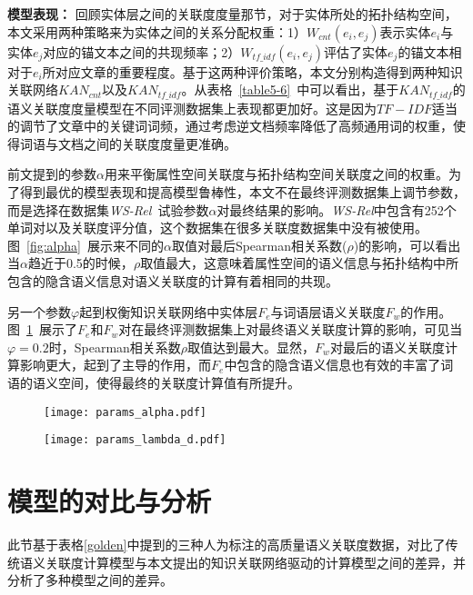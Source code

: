 \textbf{模型表现：}
回顾实体层之间的关联度度量那节，对于实体所处的拓扑结构空间，本文采用两种策略来为实体之间的关系分配权重：1）$W_{cnt}(e_i,e_j)$表示实体$e_i$与实体$e_j$对应的锚文本之间的共现频率；2）$W_{tf\_idf}(e_i,e_j)$评估了实体$e_j$的锚文本相对于$e_i$所对应文章的重要程度。基于这两种评价策略，本文分别构造得到两种知识关联网络$KAN_{cnt}$以及$KAN_{tf\_idf}$。从表格~\ref{table5-6}~中可以看出，基于$KAN_{tf\_idf}$的语义关联度度量模型在不同评测数据集上表现都更加好。这是因为$TF-IDF$适当的调节了文章中的关键词词频，通过考虑逆文档频率降低了高频通用词的权重，使得词语与文档之间的关联度度量更准确。

前文提到的参数$\alpha$用来平衡属性空间关联度与拓扑结构空间关联度之间的权重。为了得到最优的模型表现和提高模型鲁棒性，本文不在最终评测数据集上调节参数，而是选择在数据集\emph{WS-Rel}~\cite{ws/AgirreAHKPS09}试验参数$\alpha$对最终结果的影响。\emph{WS-Rel}中包含有252个单词对以及关联度评分值，这个数据集在很多关联度数据集中没有被使用。图~\ref{fig:alpha}~展示来不同的$\alpha$取值对最后Spearman相关系数($\rho$)的影响，可以看出当$\alpha$趋近于0.5的时候，$\rho$取值最大，这意味着属性空间的语义信息与拓扑结构中所包含的隐含语义信息对语义关联度的计算有着相同的共现。

另一个参数$\varphi$起到权衡知识关联网络中实体层$F_e$与词语层语义关联度$F_w$的作用。图~\ref{fig:lambda}~展示了$F_e$和$F_w$对在最终评测数据集上对最终语义关联度计算的影响，可见当$\varphi=0.2$时，Spearman相关系数$\rho$取值达到最大。显然，$F_w$对最后的语义关联度计算影响更大，起到了主导的作用，而$F_e$中包含的隐含语义信息也有效的丰富了词语的语义空间，使得最终的关联度计算值有所提升。

\begin{figure}[htbp]
    \begin{minipage}{0.48\textwidth}
      \centering
      \texttt{[image: params\_alpha.pdf]}
      \label{fig:alpha}
    \end{minipage}\hfill
    \begin{minipage}{0.48\textwidth}
      \centering
      \texttt{[image: params\_lambda\_d.pdf]}
      \label{fig:lambda}
    \end{minipage}
\end{figure}


\section{模型的对比与分析}
此节基于表格\ref{golden}中提到的三种人为标注的高质量语义关联度数据，对比了传统语义关联度计算模型与本文提出的知识关联网络驱动的计算模型之间的差异，并分析了多种模型之间的差异。


